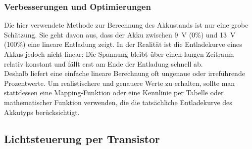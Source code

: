 \documentclass[ngerman,12pt,a4paper]{article}
\begin{document}
			 \subsubsection{Verbesserungen und Optimierungen}
		Die hier verwendete Methode zur Berechnung des Akkustands ist nur eine grobe Schätzung. Sie geht davon aus, dass der Akku zwischen 9~V (0\%) und 13~V (100\%) eine lineare Entladung zeigt. In der Realität ist die Entladekurve eines Akkus jedoch nicht linear: Die Spannung bleibt über einen langen Zeitraum relativ konstant und fällt erst am Ende der Entladung schnell ab.\\
		Deshalb liefert eine einfache lineare Berechnung oft ungenaue oder irreführende Prozentwerte. Um realistischere und genauere Werte zu erhalten, sollte man stattdessen eine Mapping-Funktion oder eine Kennlinie per Tabelle oder mathematischer Funktion verwenden, die die tatsächliche Entladekurve des Akkutyps berücksichtigt.\\
		\subsection{Lichtsteuerung per Transistor}
\end{document}

